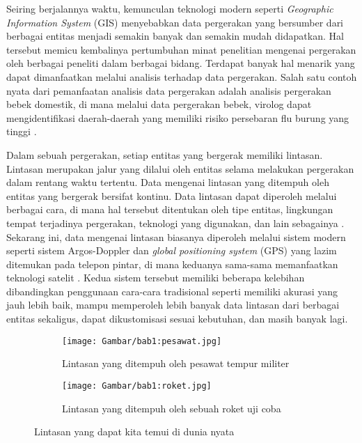 

Seiring berjalannya waktu, kemunculan teknologi modern seperti \textit{Geographic Information System} (GIS) menyebabkan data pergerakan yang bersumber dari berbagai entitas menjadi semakin banyak dan semakin mudah didapatkan. Hal tersebut memicu kembalinya pertumbuhan minat penelitian mengenai pergerakan oleh berbagai peneliti dalam berbagai bidang. Terdapat banyak hal menarik yang dapat dimanfaatkan melalui analisis terhadap data pergerakan. Salah satu contoh nyata dari pemanfaatan analisis data pergerakan adalah analisis pergerakan bebek domestik, di mana melalui data pergerakan bebek, virolog dapat mengidentifikasi daerah-daerah yang memiliki risiko persebaran flu burung yang tinggi \cite{diann:01:movement-analysis}.

Dalam sebuah pergerakan, setiap entitas yang bergerak memiliki lintasan. Lintasan merupakan jalur yang dilalui oleh entitas selama melakukan pergerakan dalam rentang waktu tertentu. Data mengenai lintasan yang ditempuh oleh entitas yang bergerak bersifat kontinu. Data lintasan dapat diperoleh melalui berbagai cara, di mana hal tersebut ditentukan oleh tipe entitas, lingkungan tempat terjadinya pergerakan, teknologi yang digunakan, dan lain sebagainya \cite{wiratma:trajectory}. Sekarang ini, data mengenai lintasan biasanya diperoleh melalui sistem modern seperti sistem Argos-Doppler dan \textit{global positioning system} (GPS) yang lazim ditemukan pada telepon pintar, di mana keduanya sama-sama memanfaatkan teknologi satelit \cite{carter:argos}. Kedua sistem tersebut memiliki beberapa kelebihan dibandingkan penggunaan cara-cara tradisional seperti memiliki akurasi yang jauh lebih baik, mampu memperoleh lebih banyak data lintasan dari berbagai entitas sekaligus, dapat dikustomisasi sesuai kebutuhan, dan masih banyak lagi.

\begin{figure}[t]
    \centering
    \begin{subfigure}[h]{0.425\textwidth}
        \centering
        \texttt{[image: Gambar/bab1:pesawat.jpg]}
        \caption{Lintasan yang ditempuh oleh pesawat tempur militer\protect\footnotemark[4]}
        \label{bab1:fighter-plane}
    \end{subfigure}
    \begin{subfigure}[h]{0.425\textwidth}
        \centering
        \texttt{[image: Gambar/bab1:roket.jpg]}
        \caption{Lintasan yang ditempuh oleh sebuah roket uji coba\protect\footnotemark[5]}
        \label{bab1:rocket}
    \end{subfigure}
    \caption[Lintasan dalam dunia nyata]{Lintasan yang dapat kita temui di dunia nyata}
    \label{bab1:trajectory}
\end{figure}

